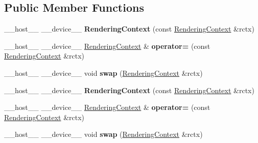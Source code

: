 \subsection*{Public Member Functions}
\begin{DoxyCompactItemize}
\item 
\+\_\+\+\_\+host\+\_\+\+\_\+ \+\_\+\+\_\+device\+\_\+\+\_\+ {\bfseries Rendering\+Context} (const \hyperlink{struct_g_p_u_1_1_rendering_context}{Rendering\+Context} \&rctx)\hypertarget{struct_g_p_u_1_1_rendering_context_afe4884d3990468289b68d97f3374de53}{}\label{struct_g_p_u_1_1_rendering_context_afe4884d3990468289b68d97f3374de53}

\item 
\+\_\+\+\_\+host\+\_\+\+\_\+ \+\_\+\+\_\+device\+\_\+\+\_\+ \hyperlink{struct_g_p_u_1_1_rendering_context}{Rendering\+Context} \& {\bfseries operator=} (const \hyperlink{struct_g_p_u_1_1_rendering_context}{Rendering\+Context} \&rctx)\hypertarget{struct_g_p_u_1_1_rendering_context_a9e187b5378b9ef7f95870a16be6c42d5}{}\label{struct_g_p_u_1_1_rendering_context_a9e187b5378b9ef7f95870a16be6c42d5}

\item 
\+\_\+\+\_\+host\+\_\+\+\_\+ \+\_\+\+\_\+device\+\_\+\+\_\+ void {\bfseries swap} (\hyperlink{struct_g_p_u_1_1_rendering_context}{Rendering\+Context} \&rctx)\hypertarget{struct_g_p_u_1_1_rendering_context_a03ef8006865af61b7010de8f4a76a3a3}{}\label{struct_g_p_u_1_1_rendering_context_a03ef8006865af61b7010de8f4a76a3a3}

\item 
\+\_\+\+\_\+host\+\_\+\+\_\+ \+\_\+\+\_\+device\+\_\+\+\_\+ {\bfseries Rendering\+Context} (const \hyperlink{struct_g_p_u_1_1_rendering_context}{Rendering\+Context} \&rctx)\hypertarget{struct_g_p_u_1_1_rendering_context_afe4884d3990468289b68d97f3374de53}{}\label{struct_g_p_u_1_1_rendering_context_afe4884d3990468289b68d97f3374de53}

\item 
\+\_\+\+\_\+host\+\_\+\+\_\+ \+\_\+\+\_\+device\+\_\+\+\_\+ \hyperlink{struct_g_p_u_1_1_rendering_context}{Rendering\+Context} \& {\bfseries operator=} (const \hyperlink{struct_g_p_u_1_1_rendering_context}{Rendering\+Context} \&rctx)\hypertarget{struct_g_p_u_1_1_rendering_context_a9e187b5378b9ef7f95870a16be6c42d5}{}\label{struct_g_p_u_1_1_rendering_context_a9e187b5378b9ef7f95870a16be6c42d5}

\item 
\+\_\+\+\_\+host\+\_\+\+\_\+ \+\_\+\+\_\+device\+\_\+\+\_\+ void {\bfseries swap} (\hyperlink{struct_g_p_u_1_1_rendering_context}{Rendering\+Context} \&rctx)\hypertarget{struct_g_p_u_1_1_rendering_context_a03ef8006865af61b7010de8f4a76a3a3}{}\label{struct_g_p_u_1_1_rendering_context_a03ef8006865af61b7010de8f4a76a3a3}

\end{DoxyCompactItemize}
